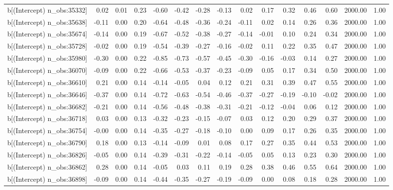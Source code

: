\begin{table}[ht]
\begin{tabular}{rrrrrrrrrrrrrrr}
  b[(Intercept) n\_obs:35332] & 0.02 & 0.01 & 0.23 & -0.60 & -0.42 & -0.28 & -0.13 & 0.02 & 0.17 & 0.32 & 0.46 & 0.60 & 2000.00 & 1.00 \\ 
  b[(Intercept) n\_obs:35638] & -0.11 & 0.00 & 0.20 & -0.64 & -0.48 & -0.36 & -0.24 & -0.11 & 0.02 & 0.14 & 0.26 & 0.36 & 2000.00 & 1.00 \\ 
  b[(Intercept) n\_obs:35674] & -0.14 & 0.00 & 0.19 & -0.67 & -0.52 & -0.38 & -0.27 & -0.14 & -0.01 & 0.10 & 0.24 & 0.34 & 2000.00 & 1.00 \\ 
  b[(Intercept) n\_obs:35728] & -0.02 & 0.00 & 0.19 & -0.54 & -0.39 & -0.27 & -0.16 & -0.02 & 0.11 & 0.22 & 0.35 & 0.47 & 2000.00 & 1.00 \\ 
  b[(Intercept) n\_obs:35980] & -0.30 & 0.00 & 0.22 & -0.85 & -0.73 & -0.57 & -0.45 & -0.30 & -0.16 & -0.03 & 0.14 & 0.27 & 2000.00 & 1.00 \\ 
  b[(Intercept) n\_obs:36070] & -0.09 & 0.00 & 0.22 & -0.66 & -0.53 & -0.37 & -0.23 & -0.09 & 0.05 & 0.17 & 0.34 & 0.50 & 2000.00 & 1.00 \\ 
  b[(Intercept) n\_obs:36610] & 0.21 & 0.00 & 0.14 & -0.14 & -0.05 & 0.04 & 0.12 & 0.21 & 0.31 & 0.39 & 0.47 & 0.55 & 2000.00 & 1.00 \\ 
  b[(Intercept) n\_obs:36646] & -0.37 & 0.00 & 0.14 & -0.72 & -0.63 & -0.54 & -0.46 & -0.37 & -0.27 & -0.19 & -0.10 & -0.02 & 2000.00 & 1.00 \\ 
  b[(Intercept) n\_obs:36682] & -0.21 & 0.00 & 0.14 & -0.56 & -0.48 & -0.38 & -0.31 & -0.21 & -0.12 & -0.04 & 0.06 & 0.12 & 2000.00 & 1.00 \\ 
  b[(Intercept) n\_obs:36718] & 0.03 & 0.00 & 0.13 & -0.32 & -0.23 & -0.15 & -0.07 & 0.03 & 0.12 & 0.20 & 0.29 & 0.37 & 2000.00 & 1.00 \\ 
  b[(Intercept) n\_obs:36754] & -0.00 & 0.00 & 0.14 & -0.35 & -0.27 & -0.18 & -0.10 & 0.00 & 0.09 & 0.17 & 0.26 & 0.35 & 2000.00 & 1.00 \\ 
  b[(Intercept) n\_obs:36790] & 0.18 & 0.00 & 0.13 & -0.14 & -0.09 & 0.01 & 0.08 & 0.17 & 0.27 & 0.35 & 0.44 & 0.53 & 2000.00 & 1.00 \\ 
  b[(Intercept) n\_obs:36826] & -0.05 & 0.00 & 0.14 & -0.39 & -0.31 & -0.22 & -0.14 & -0.05 & 0.05 & 0.13 & 0.23 & 0.30 & 2000.00 & 1.00 \\ 
  b[(Intercept) n\_obs:36862] & 0.28 & 0.00 & 0.14 & -0.05 & 0.03 & 0.11 & 0.19 & 0.28 & 0.38 & 0.46 & 0.55 & 0.64 & 2000.00 & 1.00 \\ 
  b[(Intercept) n\_obs:36898] & -0.09 & 0.00 & 0.14 & -0.44 & -0.35 & -0.27 & -0.19 & -0.09 & 0.00 & 0.08 & 0.18 & 0.28 & 2000.00 & 1.00 \\ 

\end{tabular}
\end{table}
